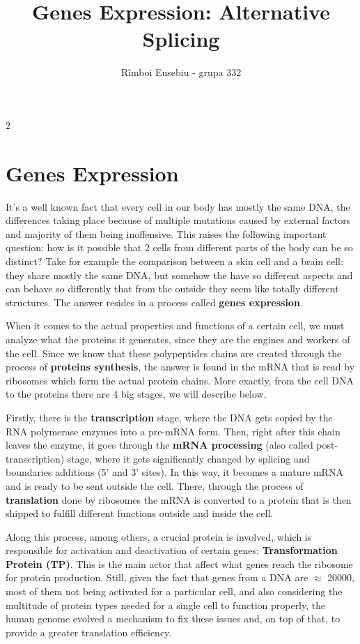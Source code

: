 \documentclass[10pt,a4paper]{article}
\title{Genes Expression: Alternative Splicing}
\author{R\^{i}mboi Eusebiu - grupa 332}
\begin{document}
	\maketitle
	
	\begin{multicols}{2}
		\section{Genes Expression}
			It's a well known fact that every cell in our body has mostly the same DNA, the differences taking place because of multiple mutations caused by external factors and majority of them being inoffensive. This raises the following important question: how is it possible that 2 cells from different parts of the body can be so distinct? Take for example the comparison between a skin cell and a brain cell: they share mostly the same DNA, but somehow the have so different aspects and can behave so differently that from the outside they seem like totally different structures. The answer resides in a process called \textbf{genes expression}.
			
			When it comes to the actual properties and functions of a certain cell, we must analyze what the proteins it generates, since they are the engines and workers of the cell. Since we know that these polypeptides chains are created through the process of \textbf{proteins synthesis}, the answer is found in the mRNA that is read by ribosomes which form the actual protein chains. More exactly, from the cell DNA to the proteins there are 4 big stages, we will describe below.
			
			Firstly, there is the \textbf{transcription} stage, where the DNA gets copied by the RNA polymerase enzymes into a pre-mRNA form. Then, right after this chain leaves the enzyme, it goes through the \textbf{mRNA processing} (also called post-transcription) stage, where it gets significantly changed by splicing and boundaries additions (5' and 3' sites). In this way, it becomes a mature mRNA and is ready to be sent outside the cell. There, through the process of \textbf{translation} done by ribosomes the mRNA is converted to a protein that is then shipped to fulfill different functions outside and inside the cell.
			
			Along this process, among others, a crucial protein is involved, which is responsible for activation and deactivation of certain genes: \textbf{Transformation Protein (TP)}. This is the main actor that affect what genes reach the ribosome for protein production. Still, given the fact that genes from a DNA are $ \approx $ 20000, most of them not being activated for a particular cell, and also considering the multitude of protein types needed for a single cell to function properly, the human genome evolved a mechanism to fix these issues and, on top of that, to provide a greater translation efficiency.
			

\end{multicols}
\end{document}
